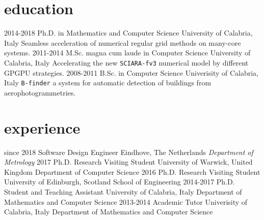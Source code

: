 \documentclass[]{twentysecondcv}
\begin{document}
\section{education}

\begin{twenty}
  \twentyitem
    {2014-2018}
    {Ph.D. {\normalfont in Mathematics and Computer Science}}
    {University of Calabria, Italy}
    {Seamless acceleration of numerical regular grid methods on many-core systems.}
  \twentyitem
    {2011-2014}
    {M.Sc. magna cum laude in Computer Science}
    {University of Calabria, Italy}
    {Accelerating the new \texttt{SCIARA-fv3} numerical model by different GPGPU strategies.}
  \twentyitem
    {2008-2011}
    {B.Sc. in Computer Science}
    {Univerisity of Calabria, Italy}
    {\texttt{B-finder} a system for automatic detection of buildings from aerophotogrammetries.}
\end{twenty}


\section{experience}

\begin{twenty}
  \twentyitem
    {since 2018}
    {Software Design Engineer}
    {Eindhove, The Netherlands}
    {\emph{Department of Metrology}}
  \twentyitem
    {2017}
    {Ph.D. {\normalfont Research Visiting Student}}
    {University of Warwick, United Kingdom}
    {Department of Computer Science}
  \twentyitem
    {2016}
    {Ph.D. {\normalfont Research Visiting Student}}
    {University of Edinburgh, Scotland}
    {School of Engineering}
  \twentyitem
    {2014-2017}
    {Ph.D. {\normalfont Student and Teaching Assistant}}
    {University of Calabria, Italy}
    {Department of Mathematics and Computer Science}
  \twentyitem
    {2013-2014}
    {Academic Tutor}
    {Univerisity of Calabria, Italy}
    {Department of Mathematics and Computer Science}
\end{twenty}




\end{document}
